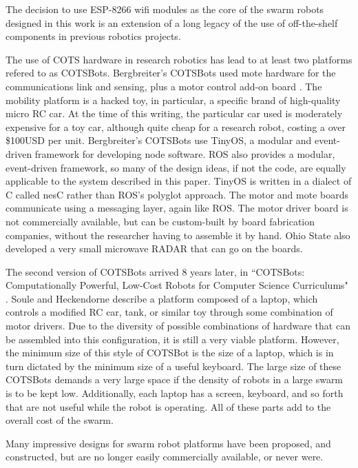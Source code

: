 \documentclass[]{article}
\begin{document}
The decision to use ESP-8266 wifi modules as the core of the swarm robots designed in this work is an extension of a long legacy of the use of off-the-shelf components in previous robotics projects. 

The use of COTS hardware in research robotics has lead to at least two platforms refered to as COTSBots.
Bergbreiter's COTSBots used mote hardware for the communications link and sensing, plus a motor control add-on board  \cite{bergbreiter2003cotsbots}. 
The mobility platform is a hacked toy, in particular, a specific brand of high-quality micro RC car.
At the time of this writing, the particular car used is moderately expensive for a toy car, although quite cheap for a research robot, costing a over \$100USD per unit. 
Bergbreiter's COTSBots use TinyOS, a modular and event-driven framework for developing node software. 
ROS also provides a modular, event-driven framework, so many of the design ideas, if not the code, are equally applicable to the system described in this paper. 
TinyOS is written in a dialect of C called nesC rather than ROS's polyglot approach. The motor and mote boards communicate using a messaging layer, again like ROS. 
The motor driver board is not commercially available, but can be custom-built by board fabrication companies, without the researcher having to assemble it by hand. 
Ohio State also developed a very small microwave RADAR that can go on the boards.

The second version of COTSBots arrived 8 years later, in ``COTSBots: Computationally Powerful, Low-Cost Robots for Computer Science Curriculums" \cite{soule2011cotsbots}. Soule and Heckendorne describe a platform composed of a laptop, which controls a modified RC car, tank, or similar toy through some combination of motor drivers. 
Due to the diversity of possible combinations of hardware that can be assembled into this configuration, it is still a very viable platform. 
However, the minimum size of this style of COTSBot is the size of a laptop, which is in turn dictated by the minimum size of a useful keyboard. 
The large size of these COTSBots demands a very large space if the density of robots in a large swarm is to be kept low. 
Additionally, each laptop has a screen, keyboard, and so forth that are not useful while the robot is operating. 
All of these parts add to the overall cost of the swarm. 

Many impressive designs for swarm robot platforms have been proposed, and constructed, but are no longer easily commercially available, or never were. 
\end{document}
